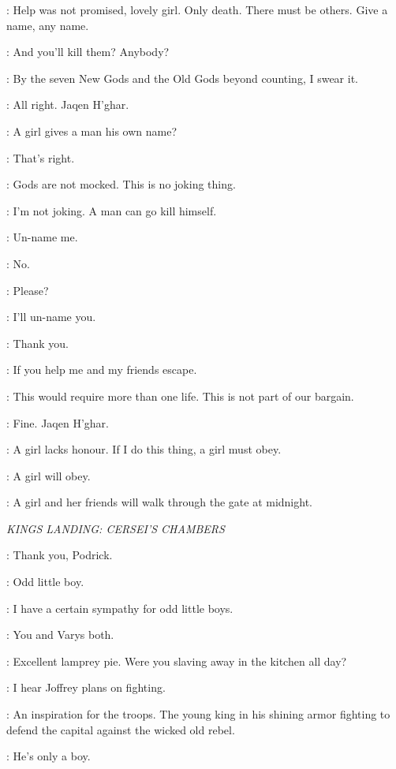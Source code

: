 \JAQEN: Help was not promised, lovely girl. Only death. There must be others. Give a name, any name. 

\ARYA: And you'll kill them? Anybody? 

\JAQEN: By the seven New Gods and the Old Gods beyond counting, I swear it. 

\ARYA: All right. Jaqen H'ghar. 

\JAQEN: A girl gives a man his own name? 

\ARYA: That's right. 

\JAQEN: Gods are not mocked. This is no joking thing. 

\ARYA: I'm not joking. A man can go kill himself. 

\JAQEN: Un-name me. 

\ARYA: No. 

\JAQEN: Please? 

\ARYA: I'll un-name you. 

\JAQEN: Thank you. 

\ARYA: If you help me and my friends escape. 

\JAQEN: This would require more than one life. This is not part of our bargain. 

\ARYA: Fine. Jaqen H'ghar. 

\JAQEN: A girl lacks honour. If I do this thing, a girl must obey. 

\ARYA: A girl will obey. 

\JAQEN: A girl and her friends will walk through the gate at midnight. 


\scene

\textit{KINGS LANDING: CERSEI'S CHAMBERS} 


\TYRION: Thank you, Podrick. 

\CERSEI: Odd little boy. 

\TYRION: I have a certain sympathy for odd little boys. 

\CERSEI: You and Varys both. 

\TYRION: Excellent lamprey pie. Were you slaving away in the kitchen all day? 

\CERSEI: I hear Joffrey plans on fighting. 

\TYRION: An inspiration for the troops. The young king in his shining armor fighting to defend the capital against the wicked old rebel. 

\CERSEI: He's only a boy. 

